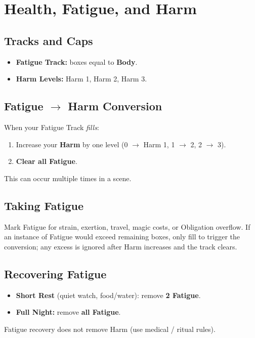 \section{Health, Fatigue, and Harm}\label{sec:health_fatigue_harm}

\subsection{Tracks and Caps}
\begin{itemize}
    \item \textbf{Fatigue Track:} boxes equal to \textbf{Body}.
    \item \textbf{Harm Levels:} Harm 1, Harm 2, Harm 3.
\end{itemize}

\subsection{Fatigue $\rightarrow$ Harm Conversion}
When your Fatigue Track \emph{fills}:
\begin{enumerate}
    \item Increase your \textbf{Harm} by one level (0 $\rightarrow$ Harm 1, 1 $\rightarrow$ 2, 2 $\rightarrow$ 3).
    \item \textbf{Clear all Fatigue}.
\end{enumerate}
This can occur multiple times in a scene.

\subsection{Taking Fatigue}
Mark Fatigue for strain, exertion, travel, magic costs, or Obligation overflow. If an instance of Fatigue would exceed remaining boxes, only fill to trigger the conversion; any excess is ignored after Harm increases and the track clears.

\subsection{Recovering Fatigue}
\begin{itemize}
    \item \textbf{Short Rest} (quiet watch, food/water): remove \textbf{2 Fatigue}.
    \item \textbf{Full Night:} remove \textbf{all Fatigue}.
\end{itemize}
Fatigue recovery does not remove Harm (use medical / ritual rules).

